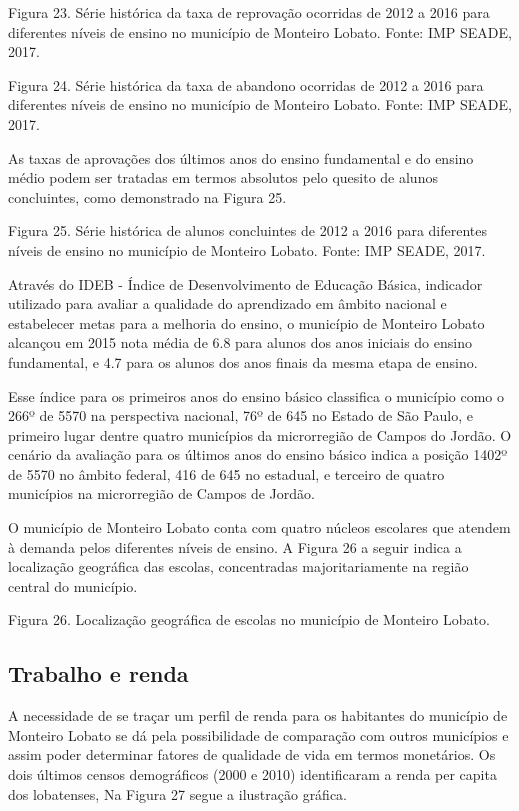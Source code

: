 Figura 23. Série histórica da taxa de reprovação ocorridas de 2012 a 2016 para diferentes níveis de ensino no município de Monteiro Lobato.
Fonte: IMP SEADE, 2017.

Figura 24. Série histórica da taxa de abandono ocorridas de 2012 a 2016 para diferentes níveis de ensino no município de Monteiro Lobato.
Fonte: IMP SEADE, 2017.

As taxas de aprovações dos últimos anos do ensino fundamental e do ensino médio podem ser tratadas em termos absolutos pelo quesito de alunos concluintes, como demonstrado na Figura 25.

Figura 25. Série histórica de alunos concluintes de 2012 a 2016 para diferentes níveis de ensino no município de Monteiro Lobato.
Fonte: IMP SEADE, 2017.

Através do IDEB - Índice de Desenvolvimento de Educação Básica, indicador utilizado para avaliar a qualidade do aprendizado em âmbito nacional e estabelecer metas para a melhoria do ensino, o município de Monteiro Lobato alcançou em 2015 nota média de 6.8 para alunos dos anos iniciais do ensino fundamental, e 4.7 para os alunos dos anos finais da mesma etapa de ensino.

Esse índice para os primeiros anos do ensino básico classifica o município como o 266º de 5570 na perspectiva nacional, 76º de 645 no Estado de São Paulo, e primeiro lugar dentre quatro municípios da microrregião de Campos do Jordão. O cenário da avaliação para os últimos anos do ensino básico indica a posição 1402º de 5570 no âmbito federal, 416 de 645 no estadual, e terceiro de quatro municípios na microrregião de Campos de Jordão.
	
O município de Monteiro Lobato conta com quatro núcleos escolares que atendem à demanda pelos diferentes níveis de ensino. A Figura 26 a seguir indica a localização geográfica das escolas, concentradas majoritariamente na região central do município. 
 
Figura 26. Localização geográfica de escolas no município de Monteiro Lobato.

\subsection{Trabalho e renda}

A necessidade de se traçar um perfil de renda para os habitantes do município de Monteiro Lobato se dá pela possibilidade de comparação com outros municípios e assim poder determinar fatores de qualidade de vida em termos monetários. Os dois últimos censos demográficos (2000 e 2010) identificaram a renda per capita dos lobatenses, Na Figura 27 segue a ilustração gráfica.
 
